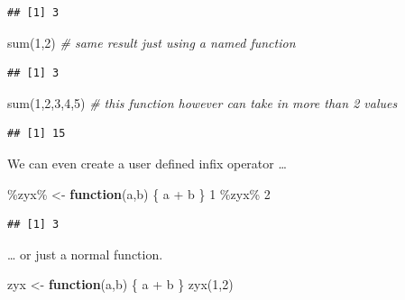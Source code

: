 \documentclass[
]{book}
\newenvironment{Shaded}{\begin{snugshade}}{\end{snugshade}}
\newcommand{\AttributeTok}[1]{\textcolor[rgb]{0.77,0.63,0.00}{#1}}
\newcommand{\CommentTok}[1]{\textcolor[rgb]{0.56,0.35,0.01}{\textit{#1}}}
\newcommand{\ControlFlowTok}[1]{\textcolor[rgb]{0.13,0.29,0.53}{\textbf{#1}}}
\newcommand{\DecValTok}[1]{\textcolor[rgb]{0.00,0.00,0.81}{#1}}
\newcommand{\FunctionTok}[1]{\textcolor[rgb]{0.00,0.00,0.00}{#1}}
\newcommand{\NormalTok}[1]{#1}
\newcommand{\OtherTok}[1]{\textcolor[rgb]{0.56,0.35,0.01}{#1}}
\newcommand{\SpecialCharTok}[1]{\textcolor[rgb]{0.00,0.00,0.00}{#1}}
\newcommand{\StringTok}[1]{\textcolor[rgb]{0.31,0.60,0.02}{#1}}
\begin{document}
\begin{verbatim}
## [1] 3
\end{verbatim}

\begin{Shaded}
\begin{Highlighting}[]
\FunctionTok{sum}\NormalTok{(}\DecValTok{1}\NormalTok{,}\DecValTok{2}\NormalTok{)       }\CommentTok{\# same result just using a named function}
\end{Highlighting}
\end{Shaded}

\begin{verbatim}
## [1] 3
\end{verbatim}

\begin{Shaded}
\begin{Highlighting}[]
\FunctionTok{sum}\NormalTok{(}\DecValTok{1}\NormalTok{,}\DecValTok{2}\NormalTok{,}\DecValTok{3}\NormalTok{,}\DecValTok{4}\NormalTok{,}\DecValTok{5}\NormalTok{) }\CommentTok{\# this function however can take in more than 2 values}
\end{Highlighting}
\end{Shaded}

\begin{verbatim}
## [1] 15
\end{verbatim}

We can even create a user defined infix operator \ldots{}

\begin{Shaded}
\begin{Highlighting}[]
\StringTok{\textasciigrave{}}\AttributeTok{\%zyx\%}\StringTok{\textasciigrave{}} \OtherTok{\textless{}{-}} \ControlFlowTok{function}\NormalTok{(a,b) \{ a }\SpecialCharTok{+}\NormalTok{ b \}}
\DecValTok{1} \SpecialCharTok{\%zyx\%} \DecValTok{2}
\end{Highlighting}
\end{Shaded}

\begin{verbatim}
## [1] 3
\end{verbatim}

\ldots{} or just a normal function.

\begin{Shaded}
\begin{Highlighting}[]
\NormalTok{zyx }\OtherTok{\textless{}{-}} \ControlFlowTok{function}\NormalTok{(a,b) \{ a }\SpecialCharTok{+}\NormalTok{ b \}}
\FunctionTok{zyx}\NormalTok{(}\DecValTok{1}\NormalTok{,}\DecValTok{2}\NormalTok{)}
\end{Highlighting}
\end{Shaded}
\end{document}
